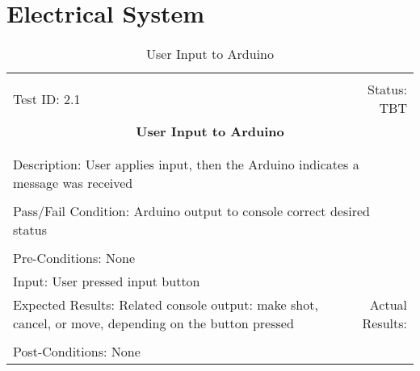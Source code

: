 \documentclass[titlepage]{article}
\begin{document}
\section{Electrical System}
\begin{center}%
\begin{table}[h!]
\begin{tabular}{|l r|}\hline&\\[-2mm]
	Test ID: 2.1	&Status: TBT\\[-3mm]
	\multicolumn{2}{|c|}{\textbf{\large{User Input to Arduino}}}\\&\\\hline&\\[-3mm]
	\multicolumn{2}{|p{\textwidth}|}{Description: User applies input, then the Arduino indicates a message was received}\\[1mm]\hline&\\[-3mm]
	\multicolumn{2}{|p{\textwidth}|}{Pass/Fail Condition: Arduino output to console correct desired status}\\[1mm]\hline&\\[-3mm]
	\multicolumn{2}{|p{\textwidth}|}{Pre-Conditions: None}\\[4mm]
	\multicolumn{2}{|p{\textwidth}|}{Input: User pressed input button}\\[2mm]\hline
	\multicolumn{1}{|p{0.49\textwidth}}{Expected Results: Related console output: make shot, cancel, or move, depending on the button pressed}	&\multicolumn{1}{|p{0.45\textwidth}|}{Actual Results:}\\\hline&\\[-3mm]
	\multicolumn{2}{|p{\textwidth}|}{Post-Conditions: None}\\\hline
\end{tabular}
\caption{User Input to Arduino}
\end{table}
\end{center}
\end{document}
